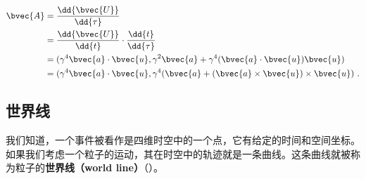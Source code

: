 \begin{equation}
\begin{aligned}
%
\bvec{A}&=\frac{\dd{\bvec{U}}}{\dd{\tau}}\\&=\frac{\dd{\bvec{U}}}{\dd{t}}\cdot\frac{\dd{t}}{\dd{\tau}}\\&=(\gamma^4\bvec{a}\cdot\bvec{u}, \gamma^2\bvec{a}+\gamma^4(\bvec{a}\cdot\bvec{u})\bvec{u})\\&=(\gamma^4\bvec{a}\cdot\bvec{u}, \gamma^4(\bvec{a}+(\bvec{a}\times\bvec{u})\times\bvec{u})~.
%
\end{aligned}
\end{equation}

\subsection{世界线}

我们知道，一个事件被看作是四维时空中的一个点，它有给定的时间和空间坐标。如果我们考虑一个粒子的运动，其在时空中的轨迹就是一条曲线。这条曲线就被称为粒子的\textbf{世界线（world line）}（）。


